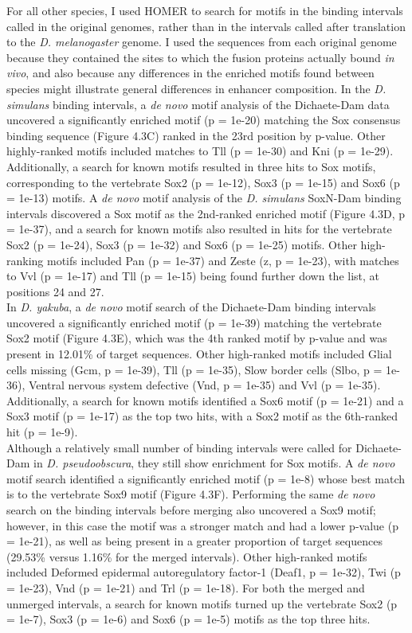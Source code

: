 For all other species, I used HOMER to search for motifs in the binding intervals called in the original genomes, rather than in the intervals called after translation to the \emph{D. melanogaster} genome. I used the sequences from each original genome because they contained the sites to which the fusion proteins actually bound \emph{in vivo}, and also because any differences in the enriched motifs found between species might illustrate general differences in enhancer composition. In the \emph{D. simulans} binding intervals, a \emph{de novo} motif analysis of the Dichaete-Dam data uncovered a significantly enriched motif (p = 1e-20) matching the Sox consensus binding sequence (Figure 4.3C) ranked in the 23rd position by p-value. Other highly-ranked motifs included matches to Tll (p = 1e-30) and Kni (p = 1e-29). Additionally, a search for known motifs resulted in three hits to Sox motifs, corresponding to the vertebrate Sox2 (p = 1e-12), Sox3 (p = 1e-15) and Sox6 (p = 1e-13) motifs. A \emph{de novo} motif analysis of the \emph{D. simulans} SoxN-Dam binding intervals discovered a Sox motif as the 2nd-ranked enriched motif (Figure 4.3D, p = 1e-37), and a search for known motifs also resulted in hits for the vertebrate Sox2 (p = 1e-24), Sox3 (p = 1e-32) and Sox6 (p = 1e-25) motifs. Other high-ranking motifs included Pan (p = 1e-37) and Zeste (z, p = 1e-23), with matches to Vvl (p = 1e-17) and Tll (p = 1e-15) being found further down the list, at positions 24 and 27.\\

In \emph{D. yakuba}, a \emph{de novo} motif search of the Dichaete-Dam binding intervals uncovered a significantly enriched motif (p = 1e-39) matching the vertebrate Sox2 motif (Figure 4.3E), which was the 4th ranked motif by p-value and was present in 12.01\% of target sequences. Other high-ranked motifs included Glial cells missing (Gcm, p = 1e-39), Tll (p = 1e-35), Slow border cells (Slbo, p = 1e-36), Ventral nervous system defective (Vnd, p = 1e-35) and Vvl (p = 1e-35). Additionally, a search for known motifs identified a Sox6 motif (p = 1e-21) and a Sox3 motif (p = 1e-17) as the top two hits, with a Sox2 motif as the 6th-ranked hit (p = 1e-9).\\

Although a relatively small number of binding intervals were called for Dichaete-Dam in \emph{D. pseudoobscura}, they still show enrichment for Sox motifs. A \emph{de novo} motif search identified a significantly enriched motif (p = 1e-8) whose best match is to the vertebrate Sox9 motif (Figure 4.3F). Performing the same \emph{de novo} search on the binding intervals before merging also uncovered a Sox9 motif; however, in this case the motif was a stronger match and had a lower p-value (p = 1e-21), as well as being present in a greater proportion of target sequences (29.53\% versus 1.16\% for the merged intervals). Other high-ranked motifs included Deformed epidermal autoregulatory factor-1 (Deaf1, p = 1e-32), Twi (p = 1e-23), Vnd (p = 1e-21) and Trl (p = 1e-18). For both the merged and unmerged intervals, a search for known motifs turned up the vertebrate Sox2 (p = 1e-7), Sox3 (p = 1e-6) and Sox6 (p = 1e-5) motifs as the top three hits.\\

